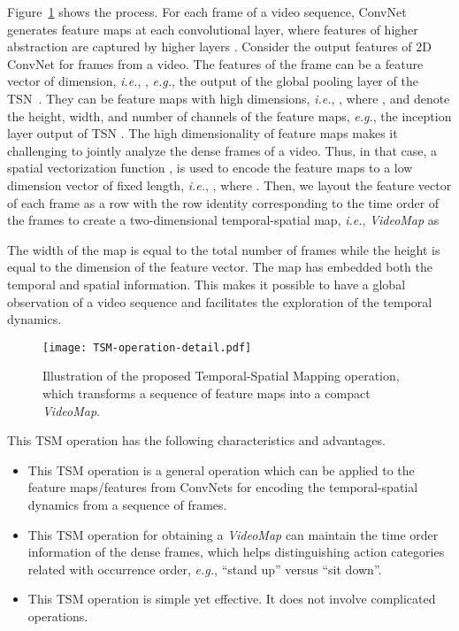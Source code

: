 \documentclass[english, 10pt, twocolumn, twoside]{IEEEtran}
\begin{document}
Figure~\ref{fig:TSM-operation-detail} shows the process. For each frame of a video sequence, ConvNet generates feature maps at each convolutional layer, where features of higher abstraction are captured by higher layers \cite{szegedy2015going}. Consider the output features of 2D ConvNet for  frames from a video. The features of the  frame can be a feature vector of dimension, \emph{i.e.}, , \emph{e.g.}, the output of the global pooling layer of the TSN~\cite{wang2016temporal}. They can be feature maps with high dimensions, \emph{i.e.}, , where ,  and  denote the height, width, and number of channels of the feature maps, \emph{e.g.}, the inception layer output of TSN \cite{wang2016temporal}. The high dimensionality of feature maps makes it challenging to jointly analyze the dense frames of a video. Thus, in that case, a spatial vectorization function , is used to encode the feature maps to a low dimension vector of fixed length, \emph{i.e.}, , where .  Then, we layout the feature vector of each frame as a row with the row identity corresponding to the time order of the frames to create a two-dimensional temporal-spatial map, \emph{i.e.}, \emph{VideoMap} as

The width of the map is equal to the total number of frames while the height is equal to the dimension of the feature vector. The map has embedded both the temporal and spatial information. This makes it possible to have a global observation of a video sequence and facilitates the exploration of the temporal dynamics.

\begin{figure}[t]
\begin{center}
\texttt{[image: TSM-operation-detail.pdf]}
\end{center}
\vspace{-7mm}
\begin{center}
\caption[width=0.95\linewidth]{Illustration of the proposed Temporal-Spatial Mapping operation, which transforms a sequence of feature maps into a compact \emph{VideoMap}.}
\end{center}
\label{fig:TSM-operation-detail}
\end{figure}


This TSM operation has the following characteristics and advantages.
\begin{itemize}
 \setlength{\itemsep}{0pt}
 \setlength{\parsep}{0pt}
 \setlength{\parskip}{0pt}
 \item This TSM operation is a general operation which can be applied to the feature maps/features from ConvNets for encoding the temporal-spatial dynamics from a sequence of frames.
 \item This TSM operation for obtaining a \emph{VideoMap} can maintain the time order information of the dense frames, which helps distinguishing action categories related with occurrence order, \emph{e.g.}, ``stand up'' versus ``sit down''.\item This TSM operation is simple yet effective. It does not involve complicated operations.
\end{itemize}
\end{document}
